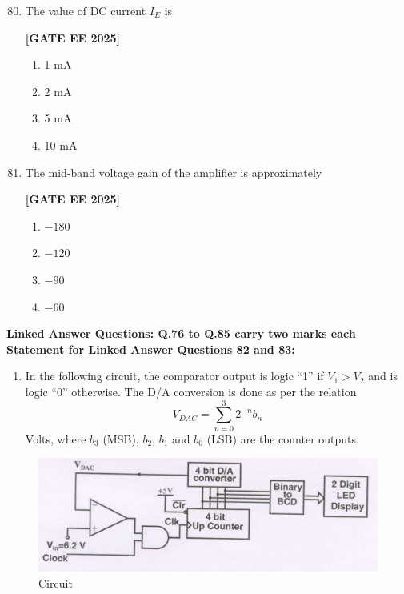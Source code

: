 \documentclass[12pt]{article}
\begin{document}
\begin{enumerate}[leftmargin=*, label=\textbf{Q.\arabic*:}]
\setcounter{enumi}{79}

\item The value of DC current $I_E$ is
 
\noindent \textbf{[GATE EE 2025]}
\begin{multicols}{4}
\begin{enumerate}
  \item 1 mA
  \item 2 mA
  \item 5 mA
  \item 10 mA
\end{enumerate}
\end{multicols}

\item The mid-band voltage gain of the amplifier is approximately
 
\noindent \textbf{[GATE EE 2025]}
\begin{multicols}{4}
\begin{enumerate}
  \item $-180$
  \item $-120$
  \item $-90$
  \item $-60$
\end{enumerate}
\end{multicols}

\end{enumerate}


 \large \textbf {Linked Answer Questions: Q.76 to Q.85 carry two marks each}
 \large \textbf {Statement for Linked Answer Questions 82 and 83: }

\begin{enumerate}
\item In the following circuit, the comparator output is logic “1” if $V_1 > V_2$ and is logic “0” otherwise. The D/A conversion is done as per the relation
\[
V_{DAC} = \sum_{n=0}^3 2^{-n} b_n
\]
Volts, where $b_3$ (MSB), $b_2$, $b_1$ and $b_0$ (LSB) are the counter outputs.
\end{enumerate}
\begin{figure}[H]\centering
\includegraphics[width=0.6\columnwidth]{figs/q8283.png}
\caption{Circuit}
\label{fig:q8283}
\end{figure}
\end{document}
